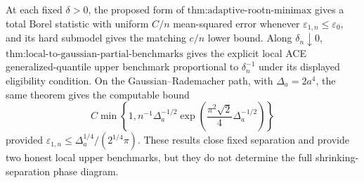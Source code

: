 At each fixed \(\delta>0\), the proposed form of \(\text{thm:adaptive-rootn-minimax}\) gives a total Borel statistic with uniform \(C/n\) mean-squared error whenever \(\varepsilon_{1,n}\le\varepsilon_0\), and its hard submodel gives the matching \(c/n\) lower bound.  Along \(\delta_n\downarrow0\), \(\text{thm:local-to-gaussian-partial-benchmarks}\) gives the explicit local ACE generalized-quantile upper benchmark proportional to \(\delta_n^{-1}\) under its displayed eligibility condition.  On the Gaussian--Rademacher path, with \(\Delta_a=2a^4\), the same theorem gives the computable bound
\[
 C\min\left\{1,
 n^{-1}\Delta_a^{-1/2}
 \exp\left(\frac{\pi^2\sqrt2}{4}\Delta_a^{-1/2}\right)
 \right\}
\]
provided \(\varepsilon_{1,n}\le\Delta_a^{1/4}/(2^{1/4}\pi)\).  These results close fixed separation and provide two honest local upper benchmarks, but they do not determine the full shrinking-separation phase diagram.